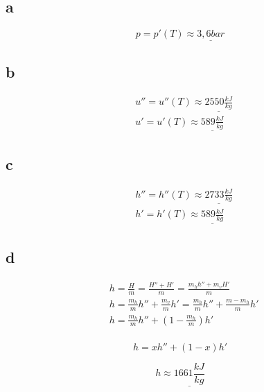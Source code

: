 \documentclass[12pt,a4paper,finnish]{article}
\begin{document}
\subsection{a}

\begin{equation}
 p = p'(T) \approx \underline{3,6 bar} 
\end{equation}

\subsection{b}

\begin{align}
 & u'' = u''(T) \approx \underline{2550\frac{kJ}{kg}}\\
 & u' = u'(T) \approx \underline{589\frac{kJ}{kg}}
\end{align}

\subsection{c}

\begin{align}
 & h'' = h''(T) \approx \underline{2733\frac{kJ}{kg}}\\
 & h' = h'(T) \approx \underline{589\frac{kJ}{kg}}
\end{align}

\subsection{d}

\begin{align}
 & h = \frac{H}{m} = \frac{H'' + H'}{m} = \frac{m_hh'' + m_vH'}{m}\\
 & h = \frac{m_h}{m}h'' + \frac{m_v}{m}h' = \frac{m_h}{m}h'' + \frac{m - m_h}{m}h'\\
 & h = \frac{m_h}{m}h'' + \left(1 - \frac{m_h}{m}\right)h'\\
\end{align}

\begin{framed}
 \begin{equation}
  h = xh'' + (1 - x)h'
 \end{equation}
\end{framed}

\begin{equation}
 h \approx \underline{1661 \frac{kJ}{kg}}
\end{equation}
\end{document}
